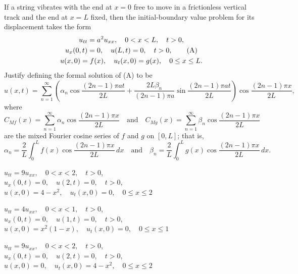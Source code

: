 \begin{exerciselist}
\item\label{exer:12.2.17}If a string vibrates with the end at $x=0$ free to move in a
frictionless
vertical track and the end at $x=L$ fixed, then the initial-boundary
value problem for its displacement takes the form
\begin{gather}
u_{tt}=a^2u_{xx},\quad 0<x<L,\quad t>0,\notag\\
 u_x(0,t)=0,\quad u(L,t)=0,\quad t>0,\tag{A}\\
u(x,0)=f(x),\quad u_t(x,0)=g(x),\quad 0\le x\le L.\notag
\end{gather}
Justify defining the formal solution of (A) to be
\[
u(x,t)=\sum_{n=1}^\infty
\left(\alpha_n\cos\frac{(2n-1)\pi a
t}{2L}+\frac{2L\beta_n}{(2n-1)\pi a}\sin\frac{(2n-1)\pi
at}{2L}\right)
\cos\frac{(2n-1)\pi
x}{2L},
\]
where
\[
C_{M\!f}(x)=\sum_{n=1}^\infty\alpha_n\cos\frac{(2n-1)\pi x}{2L}
\quad\text{and}\quad
C_{M\!g}(x)=\sum_{n=1}^\infty\beta_n\cos\frac{(2n-1)\pi x}{2L}
\]
are the mixed Fourier cosine series of $f$ and $g$
on $[0,L]$; that is,
\[
\alpha_n=\frac{2}{L}\int_0^Lf(x)\cos\frac{(2n-1)\pi x}{2L}\,dx
\quad\text{and}\quad
\beta_n=\frac{2}{L}\int_0^Lg(x)\cos\frac{(2n-1)\pi x}{2L}\,dx.
\]





\item\label{exer:12.2.18}$u_{tt}=9u_{xx},\quad 0<x<2,\quad t>0$,\\
$u_x(0,t)=0,\quad u(2,t)=0,\quad t>0$,\\
$u(x,0)=4-x^2,\quad u_t(x,0)=0,\quad0\le x\le2$

\item\label{exer:12.2.19}$u_{tt}=4u_{xx},\quad 0<x<1,\quad t>0$,\\
$u_x(0,t)=0,\quad u(1,t)=0,\quad t>0$,\\
$u(x,0)=x^2(1-x),\quad u_t(x,0)=0,\quad0\le x\le 1$

\item\label{exer:12.2.20}$u_{tt}=9u_{xx},\quad 0<x<2,\quad t>0$,\\
$u_x(0,t)=0,\quad u(2,t)=0,\quad t>0$,\\
$u(x,0)=0,\quad u_t(x,0)=4-x^2,\quad0\le x\le2$


\end{exerciselist}
